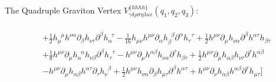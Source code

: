 \documentclass[aspectratio=169,usenames,dvipsnames]{beamer}
\begin{document}
\begin{frame}{\centering {}\\
    \small The Quadruple Graviton Vertex $ V_{\gamma\delta\rho\sigma\eta\lambda\kappa\epsilon}^{\{h h h h\}}
  (q_1,q_2,q_3)$:}
\begin{tcolorbox}[enhanced,width=\textwidth,colframe=LUCopper,arc=4pt,boxrule=1pt,drop
  fuzzy shadow]
\begin{align*}
  \\   & + \frac{1}{2} h_{\mu}^{\;\;\mu} h^{\nu \alpha} \partial_{\beta}h_{\nu \tau} \partial^{\beta}h_{\alpha}^{\;\;\tau}  - \frac{1}{16} h_{\mu \nu} h^{\mu \nu} \partial_{\alpha} h_{\beta}^{\;\; \beta} \partial^{\alpha} h_{\tau}^{\;\; \tau}
       + \frac{1}{2} h^{\mu \nu} \partial_{\mu}h_{\nu \alpha} \partial^{\beta} h^{\alpha \tau} h_{\beta \tau} \\
     & + \frac{1}{8} h^{\mu \nu} \partial_{\mu} h_{\alpha}^{\;\; \alpha} h_{\nu \beta} \partial^{\beta} h_{\tau}^{\;\; \tau}
     - h^{\mu \nu} \partial_{\mu} h^{\alpha \beta} h_{\nu \alpha} \partial^{\tau}h_{\beta \tau} 
      + \frac{1}{2} h^{\mu \nu} \partial_{\mu}h_{\alpha \beta} h_{\nu \tau} \partial^{\tau} h^{\alpha \beta} \\
     & - h^{\mu \nu} \partial_{\mu} h_{\alpha \beta} h^{\alpha \tau} \partial_{\tau} h_{\nu}^{\;\;\beta} 
      + \frac{1}{2} h^{\mu \nu} h_{\nu \alpha} \partial_{\beta} h_{\mu \tau} \partial^{\beta} h^{\alpha \tau}
      + h^{\mu \nu} \partial_{\nu} h_{\alpha \beta} h^{\alpha \beta} \partial^{\tau} h_{\mu \tau} \Big ]
\end{align*}  
\end{tcolorbox}
\vspace{100mm}
\end{frame}
\end{document}
